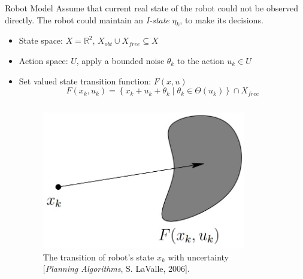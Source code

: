 \begin{frame}{Robot Model}
Assume that current real state of the robot could not be observed directly.  The
robot could maintain an \emph{I-state} $\eta_k$, to make its decisions.
\begin{itemize}
\item State space: $X = \mathbb{R}^2$,  $X_{obt} \cup X_{free} \subseteq X$
\item Action space: $U$, apply a bounded noise $\theta_k$ to the action
  $u_k \in U$
\item Set valued state transition function: $F(x, u)$
  \begin{equation}
    \label{eq:state-trans}
    F(x_k, u_k) = \left\{
      x_k + u_k + \theta_k
      \mid
      \theta_k \in \Theta(u_k)
    \right\} \cap X_{free}
  \end{equation}
  \begin{columns}
  \begin{column}{0.4\textwidth}
        \begin{figure}
          \centering
          \includegraphics[scale=0.2]{figs/istate.jpg}
          \caption{\scriptsize{The transition of robot's state $x_k$ with
              uncertainty [\emph{Planning Algorithms}, S. LaValle, 2006].}}
        \end{figure}
      \end{column}
      \begin{column}{0.5\textwidth}
          \begin{figure}

\end{figure}
\end{column}
\end{columns}
\end{itemize}
\end{frame}
